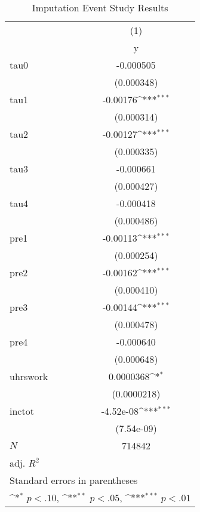 \begin{table}[htbp]\centering
\def\sym#1{\ifmmode^{#1}\else\(^{#1}\)\fi}
\caption{Imputation Event Study Results}
\begin{tabular}{l*{1}{c}}
\hline\hline
            &\multicolumn{1}{c}{(1)}\\
            &\multicolumn{1}{c}{y}\\
\hline
tau0        &   -0.000505         \\
            &  (0.000348)         \\
[1em]
tau1        &    -0.00176\sym{***}\\
            &  (0.000314)         \\
[1em]
tau2        &    -0.00127\sym{***}\\
            &  (0.000335)         \\
[1em]
tau3        &   -0.000661         \\
            &  (0.000427)         \\
[1em]
tau4        &   -0.000418         \\
            &  (0.000486)         \\
[1em]
pre1        &    -0.00113\sym{***}\\
            &  (0.000254)         \\
[1em]
pre2        &    -0.00162\sym{***}\\
            &  (0.000410)         \\
[1em]
pre3        &    -0.00144\sym{***}\\
            &  (0.000478)         \\
[1em]
pre4        &   -0.000640         \\
            &  (0.000648)         \\
[1em]
uhrswork    &   0.0000368\sym{*}  \\
            & (0.0000218)         \\
[1em]
inctot      &   -4.52e-08\sym{***}\\
            &  (7.54e-09)         \\
\hline
\(N\)       &      714842         \\
adj. \(R^{2}\)&                     \\
\hline\hline
\multicolumn{2}{l}{\footnotesize Standard errors in parentheses}\\
\multicolumn{2}{l}{\footnotesize \sym{*} \(p<.10\), \sym{**} \(p<.05\), \sym{***} \(p<.01\)}\\
\end{tabular}
\end{table}
